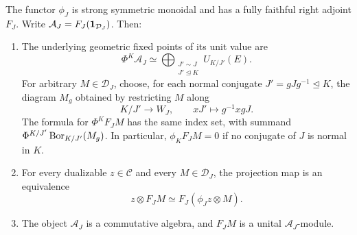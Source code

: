 \begin{lemma}\label{lem:layer-adjunction}
The functor \(\phi_J\) is strong symmetric monoidal and has a fully faithful
right adjoint \(F_J\). Write
\(\mathcal A_J=F_J(\mathbf1_{\mathcal D_J})\). Then:
\begin{enumerate}[label=\textup{(\roman*)}]
\item The underlying geometric fixed points of its unit value are
\begin{equation}\label{eq:layer-unit}
 \Phi^K \mathcal A_J\simeq
 \bigoplus_{\substack{J'\sim J\\J'\trianglelefteq K}}
 U_{K/J'}(E).
\end{equation}
For arbitrary \(M\in\mathcal D_J\), choose, for each normal conjugate
\(J'=gJg^{-1}\trianglelefteq K\), the diagram \(M_g\) obtained by
restricting \(M\) along
\[
 K/J'\longrightarrow W_J,\qquad xJ'\longmapsto g^{-1}xgJ.
\]
The formula for \(\Phi^K F_JM\) has the same index set, with summand
\(\Phi^{K/J'}\operatorname{Bor}_{K/J'}(M_g)\). In particular,
\(\phi_KF_JM=0\) if no conjugate of \(J\) is normal in \(K\).
\item For every dualizable \(z\in\mathcal C\) and every
\(M\in\mathcal D_J\), the projection map is an equivalence
\begin{equation}\label{eq:layer-projection}
 z\otimes F_JM\simeq F_J(\phi_Jz\otimes M).
\end{equation}
\item The object \(\mathcal A_J\) is a commutative algebra, and \(F_JM\) is a
unital \(\mathcal A_J\)-module.
\end{enumerate}
\end{lemma}


